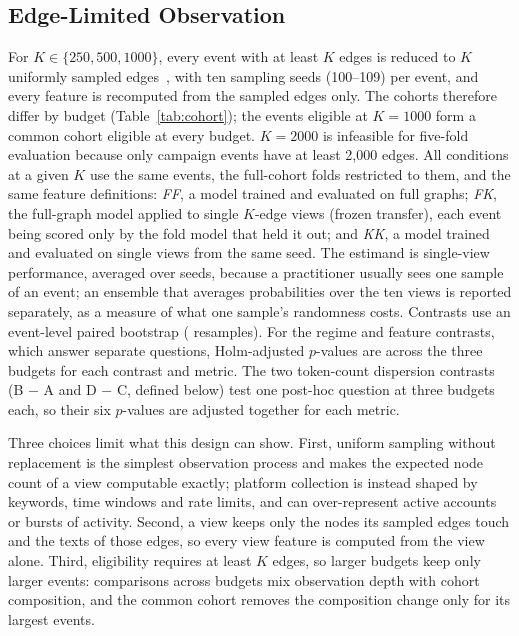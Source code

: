 \documentclass[conference]{IEEEtran}
\begin{document}
\subsection{Edge-Limited Observation}
For $K\in\{250,500,1000\}$, every event with at least $K$ edges is reduced to $K$ uniformly sampled edges~\cite{ahmed}, with ten sampling seeds (100--109) per event, and every feature is recomputed from the sampled edges only. The cohorts therefore differ by budget (Table~\ref{tab:cohort}); the \RCommonN{} events eligible at $K=1000$ form a common cohort eligible at every budget. $K=2000$ is infeasible for five-fold evaluation because only \RTwoThousandCamp{} campaign events have at least 2,000 edges. All conditions at a given $K$ use the same events, the full-cohort folds restricted to them, and the same feature definitions: \emph{FF}, a model trained and evaluated on full graphs; \emph{FK}, the full-graph model applied to single $K$-edge views (frozen transfer), each event being scored only by the fold model that held it out; and \emph{KK}, a model trained and evaluated on single views from the same seed. The estimand is single-view performance, averaged over seeds, because a practitioner usually sees one sample of an event; an ensemble that averages probabilities over the ten views is reported separately, as a measure of what one sample's randomness costs. Contrasts use an event-level paired bootstrap (\RSTwoNBoot{} resamples). For the regime and feature contrasts, which answer separate questions, Holm-adjusted $p$-values are across the three budgets for each contrast and metric. The two token-count dispersion contrasts (B $-$ A and D $-$ C, defined below) test one post-hoc question at three budgets each, so their six $p$-values are adjusted together for each metric.

Three choices limit what this design can show. First, uniform sampling without replacement is the simplest observation process and makes the expected node count of a view computable exactly; platform collection is instead shaped by keywords, time windows and rate limits, and can over-represent active accounts or bursts of activity. Second, a view keeps only the nodes its sampled edges touch and the texts of those edges, so every view feature is computed from the view alone. Third, eligibility requires at least $K$ edges, so larger budgets keep only larger events: comparisons across budgets mix observation depth with cohort composition, and the common cohort removes the composition change only for its \RCommonN{} largest events.
\end{document}
